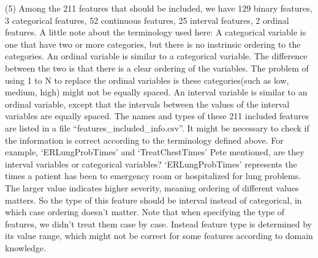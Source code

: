 \documentclass[11pt]{article}
\begin{document}
(5) Among the 211 features that should be included, we have 129 binary features, 3 categorical features, 52 continuous features, 25 interval features, 2 ordinal features. A little note about the terminology used here: A categorical variable is one that have two or more categories, but there is no instrinsic ordering to the categories. An ordinal variable is similar to a categorical variable. The difference between the two is that there is a clear ordering of the variables. The problem of using 1 to N to replace the ordinal variables is these categories(such as low, medium, high) might not be equally spaced. An interval variable is similar to an ordinal variable, except that the intervals between the values of the interval variables are equally spaced. The names and types of these 211 included features are listed in a file ``features\_included\_info.csv''. It might be necessary to check if the information is correct according to the terminology defined above. For example, `ERLungProbTimes' and `TreatChestTimes' Pete mentioned, are they interval variables or categorical variables? `ERLungProbTimes' represents the times a patient has been to emergency room or hospitalized for lung problems. The larger value indicates higher severity, meaning ordering of different values matters. So the type of this feature should be interval instead of categorical, in which case ordering doesn't matter. Note that when specifying the type of features, we didn't treat them case by case. Instead feature type is determined by its value range, which might not be correct for some features according to domain knowledge.\\
\\

\end{document}
